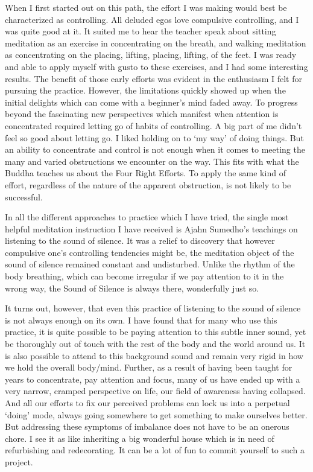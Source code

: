 When I first started out on this path, the effort I was making would
best be characterized as controlling. All deluded egos love compulsive
controlling, and I was quite good at it. It suited me to hear the
teacher speak about sitting meditation as an exercise in concentrating
on the breath, and walking meditation as concentrating on the placing,
lifting, placing, lifting, of the feet. I was ready and able to apply
myself with gusto to these exercises, and I had some interesting
results. The benefit of those early efforts was evident in the
enthusiasm I felt for pursuing the practice. However, the limitations
quickly showed up when the initial delights which can come with a
beginner’s mind faded away. To progress beyond the fascinating new
perspectives which manifest when attention is concentrated required
letting go of habits of controlling. A big part of me didn’t feel so
good about letting go. I liked holding on to ‘my way’ of doing things.
But an ability to concentrate and control is not enough when it comes to
meeting the many and varied obstructions we encounter on the way. This
fits with what the Buddha teaches us about the Four Right
Efforts.\cite{right-effort}
To apply the same kind of effort, regardless of the nature of the
apparent obstruction, is not likely to be successful.

In all the different approaches to practice which I have tried, the
single most helpful meditation instruction I have received is Ajahn
Sumedho’s teachings on listening to the sound of
silence.\cite{inner-listening,aj-sumedho-sound-of-silence}
It was a relief to discovery that however compulsive one’s controlling
tendencies might be, the meditation object of the sound of silence
remained constant and undisturbed. Unlike the rhythm of the body
breathing, which can become irregular if we pay attention to it in the
wrong way, the Sound of Silence is always there, wonderfully just so.

It turns out, however, that even this practice of listening to the sound
of silence is not always enough on its own. I have found that for many
who use this practice, it is quite possible to be paying attention to
this subtle inner sound, yet be thoroughly out of touch with the rest of
the body and the world around us. It is also possible to attend to this
background sound and remain very rigid in how we hold the overall
body/mind. Further, as a result of having been taught for years to
concentrate, pay attention and focus, many of us have ended up with a
very narrow, cramped perspective on life, our field of awareness having
collapsed. And all our efforts to fix our perceived problems can lock us
into a perpetual ‘doing’ mode, always going somewhere to get something
to make ourselves better. But addressing these symptoms of imbalance
does not have to be an onerous chore. I see it as like inheriting a big
wonderful house which is in need of refurbishing and redecorating. It
can be a lot of fun to commit yourself to such a project.

